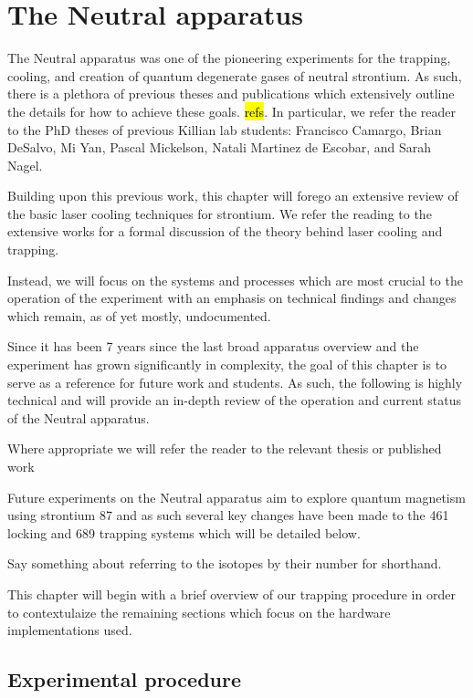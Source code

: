 \chapter{The Neutral apparatus}
\label{ch:chap2}

The Neutral apparatus was one of the pioneering experiments for the trapping, cooling, and creation of quantum degenerate gases of neutral strontium. As such, there is a plethora of previous theses and publications which extensively outline the details for how to achieve these goals. \hl{refs}. In particular, we refer the reader to the PhD theses of previous Killian lab students: Francisco Camargo, Brian DeSalvo, Mi Yan, Pascal Mickelson, Natali Martinez de Escobar, and Sarah Nagel.

Building upon this previous work, this chapter will forego an extensive review of the basic laser cooling techniques for strontium. 
We refer the reading to the extensive works for a formal discussion of the theory behind laser cooling and trapping.

Instead, we will focus on the systems and processes which are most crucial to the operation of the experiment with an emphasis on technical findings and changes which remain, as of yet mostly, undocumented.

Since it has been 7 years since the last broad apparatus overview and the experiment has grown significantly in complexity, the goal of this chapter is to serve as a reference for future work and students. As such, the following is highly technical and will provide an in-depth review of the operation and current status of the Neutral apparatus.

Where appropriate we will refer the reader to the relevant thesis or published work

Future experiments on the Neutral apparatus aim to explore quantum magnetism using strontium 87 and as such several key changes have been made to the 461 locking and 689 trapping systems which will be detailed below.

Say something about referring to the isotopes by their number for shorthand.

This chapter will begin with a brief overview of our trapping procedure in order to contextulaize the remaining sections which focus on the hardware implementations used.  

\section{Experimental procedure} \label{sec:trapping}

